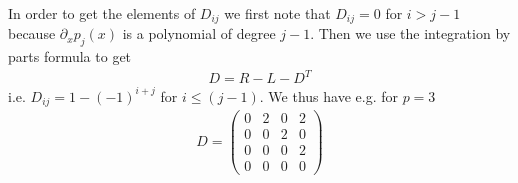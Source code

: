 \documentclass[a4paper,12pt]{scrartcl}
\begin{document}
In order to get the elements of $D_{ij}$ we first note that $D_{ij} = 0$ for
$i > j-1$ because $\partial_x p_j(x)$ is a polynomial of degree $j-1$. Then
we use the integration by parts formula to get
\begin{align}
    D = R - L - D^T
    \label{eq:legendre_derivative}
\end{align}
i.e. $D_{ij} = 1 - (-1)^{i+j}$ for $i\le (j-1)$. We thus have e.g. for $p=3$
\begin{align}
    D = \begin{pmatrix}
        0 & 2 & 0 & 2 \\
        0 & 0 & 2 & 0 \\
        0 & 0 & 0 & 2 \\
        0 & 0 & 0 & 0 
    \end{pmatrix}
    \label{eq:example_derivative}
\end{align}
\end{document}
